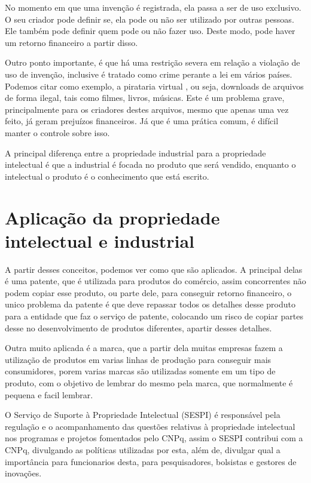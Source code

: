 \documentclass[12pt]{article}
\begin{document}
No momento em que uma invenção é registrada, ela passa a ser de uso exclusivo. O seu criador pode definir se, ela pode ou não ser utilizado por outras pessoas. Ele também pode definir quem pode ou não fazer uso. Deste modo, pode haver um retorno financeiro a partir disso.

Outro ponto importante, é que há uma restrição severa em relação a violação de uso de invenção, inclusive é tratado como crime perante a lei em vários países. Podemos citar como exemplo, a pirataria virtual \cite{PIRATE}, ou seja, downloads de arquivos de forma ilegal, tais como filmes, livros, músicas. Este é um problema grave, principalmente para os criadores destes arquivos, mesmo que apenas uma vez feito, já geram prejuízos financeiros. Já que é uma prática comum, é difícil manter o controle sobre isso.

A principal diferença entre a propriedade industrial para a propriedade intelectual é que a
industrial é focada no produto que será vendido, enquanto o intelectual o produto é o
conhecimento que está escrito.

\section{Aplicação da propriedade intelectual e industrial} \label{sec:aplicacao}

A partir desses conceitos, podemos ver como que são aplicados.
A principal delas é uma patente, que é utilizada para produtos do comércio,
assim concorrentes não podem copiar esse produto, ou parte dele, para conseguir retorno
financeiro, o unico problema da patente é que deve repassar todos os detalhes desse produto
para a entidade que faz o serviço de patente, colocando um risco de copiar partes desse
no desenvolvimento de produtos diferentes, apartir desses detalhes.

Outra muito aplicada é a marca, que a partir dela muitas empresas fazem a utilização de
produtos em varias linhas de produção para conseguir mais consumidores, porem varias marcas
são utilizadas somente em um tipo de produto, com o objetivo de lembrar do mesmo pela marca,
que normalmente é pequena e facil lembrar.

O Serviço de Suporte à Propriedade Intelectual (SESPI) é responsável pela regulação e o acompanhamento das questões relativas à propriedade intelectual nos programas e projetos fomentados pelo CNPq\cite{CNPQ}, assim o SESPI contribui com a CNPq, divulgando as políticas
utilizadas por esta, além de, divulgar qual a importância para funcionarios desta, para pesquisadores, bolsistas e gestores de inovações.
\end{document}

